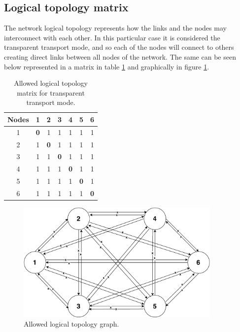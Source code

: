 \subsection{Logical topology matrix}
The network logical topology represents how the links and the nodes may interconnect with each other. In this particular case it is considered the transparent transport mode, and so each of the nodes will connect to others creating direct links between all nodes of the network. The same can be seen below represented in a matrix in table \ref{Transparentlogical_topology} and graphically in figure \ref{allowed_optical_surv_transparent2}.
\begin{table}[H]
	\centering	
	\begin{tabular}{|c|c|c|c|c|c|c|}
		\hline
		\multicolumn{1}{|l|}{\textbf{Nodes}} & 1   & 2   & 3   & 4   & 5   & 6  \\ \hline
		1                           & \textbf{0}   & 1 & 1 & 1 & 1 & 1 \\ \hline
		2                           & 1 & \textbf{0}   & 1 & 1 & 1 & 1 \\ \hline
		3                           & 1 & 1 & \textbf{0}   & 1 & 1 & 1 \\ \hline
		4                           & 1 & 1 & 1 & \textbf{0}   & 1 & 1 \\ \hline
		5                           & 1 & 1 & 1 & 1 & \textbf{0}   & 1 \\ \hline
		6                           & 1 & 1 & 1 & 1 & 1 & \textbf{0}   \\ \hline
	\end{tabular}
	\caption{Allowed logical topology matrix for transparent transport mode.}
	\label{Transparentlogical_topology}
\end{table}
\begin{figure}[H]
	\centering
	\includegraphics[width=10cm]{sdf/heuristic/transparent/figures/logicalTopology}
	\caption{Allowed logical topology graph.}
	\label{allowed_optical_surv_transparent2}
\end{figure}

